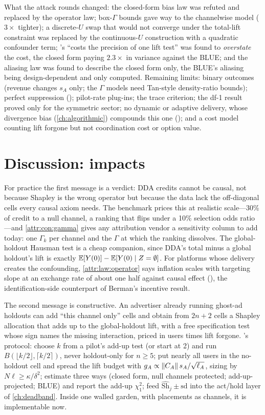 What the attack rounds changed: the closed-form bias law was refuted and replaced by the operator law; box-$\Gamma$ bounds gave way to the channelwise model ($3\times$ tighter); a discrete-$U$ swap that would not converge under the total-lift constraint was replaced by the continuous-$U$ construction with a quadratic confounder term; 's ``costs the precision of one lift test'' was found to \emph{overstate} the cost, the closed form paying $2.3\times$ in variance against the BLUE; and the aliasing law was found to describe the closed form only, the BLUE's aliasing being design-dependent and only computed. Remaining limits: binary outcomes (revenue changes $s_A$ only; the $\Gamma$ models need Tan-style density-ratio bounds); perfect suppression (); pilot-rate plug-ins; the trace criterion; the df-1 result proved only for the symmetric sector; no dynamic or adaptive delivery, whose divergence bias (\cref{ch:algorithmic}) compounds this one (); and a cost model counting lift forgone but not coordination cost or option value.

\section{Discussion: impacts}

For practice the first message is a verdict: DDA credits cannot be causal, not because Shapley is the wrong operator but because the data lack the off-diagonal cells every causal axiom needs. The benchmark prices this at realistic scale---30\% of credit to a null channel, a ranking that flips under a 10\% selection odds ratio---and \cref{attr:con:gamma} gives any attribution vendor a sensitivity column to add today: one $\Gamma_k$ per channel and the $\Gamma$ at which the ranking dissolves. The global-holdout Hausman test is a cheap companion, since DDA's total minus a global holdout's lift is exactly $\mathbb{E}[Y(0)] - \mathbb{E}[Y(0) \mid Z = \emptyset]$. For platforms whose delivery creates the confounding, \cref{attr:law:operator} says inflation scales with targeting slope at an exchange rate of about one half against causal effect (), the identification-side counterpart of Berman's incentive result.

The second message is constructive. An advertiser already running ghost-ad holdouts can add ``this channel only'' cells and obtain from $2n + 2$ cells a Shapley allocation that adds up to the global-holdout lift, with a free specification test whose sign names the missing interaction, priced in users times lift forgone. 's protocol: choose $k$ from a pilot's add-up test (or start at 2) and run $B(\lfloor k/2 \rfloor, \lceil k/2 \rceil)$, never holdout-only for $n \ge 5$; put nearly all users in the no-holdout cell and spread the lift budget with $g_A \propto \left\|C_A\right\| s_A/\sqrt{\ell_A}$, sizing by $N\ell \ge \kappa/\delta^2$; estimate three ways (closed form, null channels protected; add-up-projected; BLUE) and report the add-up $\chi^2_1$; feed $\hat{\mathrm{Sh}}_j \pm \mathrm{sd}$ into the act/hold layer of \cref{ch:deadband}. Inside one walled garden, with placements as channels, it is implementable now.

